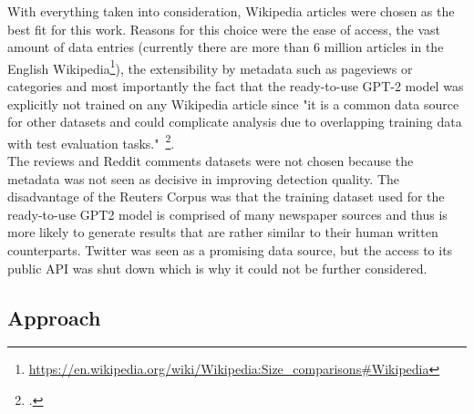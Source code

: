 With everything taken into consideration, Wikipedia articles were chosen as the best fit for this work. Reasons for this choice were the ease of access, the vast amount of data entries (currently there are more than 6 million articles in the English Wikipedia\footnote{\url{https://en.wikipedia.org/wiki/Wikipedia:Size_comparisons\#Wikipedia}}), the extensibility by metadata such as pageviews or categories and most importantly the fact that the ready-to-use GPT-2 model was explicitly not trained on any Wikipedia article since "it is a common data source for other datasets and could complicate analysis due to overlapping training data with test evaluation tasks."~\footcite{radford2019language}. \\
The reviews and Reddit comments datasets were not chosen because the metadata was not seen as decisive in improving detection quality. The disadvantage of the Reuters Corpus was that the training dataset used for the ready-to-use GPT2 model is comprised of many newspaper sources and thus is more likely to generate results that are rather similar to their human written counterparts. Twitter was seen as a promising data source, but the access to its public API was shut down which is why it could not be further considered.







\subsection{Approach}
\label{sec:approach}


